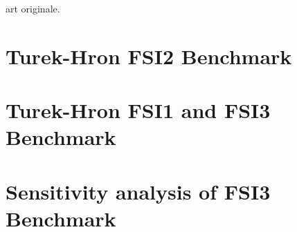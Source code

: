 \cite{ramm1998fluid} art originale.
\cite{walhorn2002space}
\cite{matthies2003partitioned}
\cite{dettmer2006computational}
\cite{olivier2009fluid}
\cite{wood2010partitioned}
\cite{kassiotis2011nonlinear}
\cite{habchi2013partitioned}
\cite{froehle2014high}


\section{Turek-Hron FSI2 Benchmark}



\section{Turek-Hron FSI1 and FSI3 Benchmark}


\section{Sensitivity analysis of FSI3 Benchmark}





